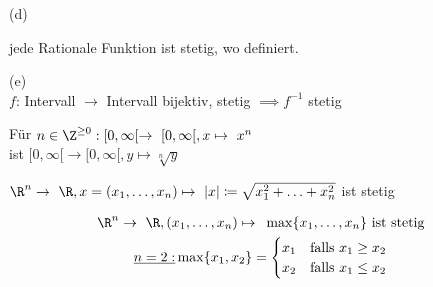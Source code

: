 (d)\\
\begin{folge}
	jede Rationale Funktion ist stetig, wo definiert.
\end{folge}

(e)\\
$f$: Intervall $\rightarrow$ Intervall bijektiv, stetig $\implies f^{-1}$ stetig\\
\begin{bsp*}
	Für $n \in \Z^{\geq 0} : [0,\infty[ \rightarrow [0,\infty[, x \mapsto x^n$\\
	ist $[0,\infty[ \rightarrow [0,\infty[, y \mapsto \sqrt[n]{y}$
\end{bsp*}
\begin{bsp*}
	$\R^n \rightarrow \R , x = ( x_1 , \dotsc , x_n ) \mapsto \abs{x} \coloneqq \sqrt{x_1^2 + \dotsc + x_n^2}$ ist stetig
\end{bsp*}
\begin{bsp*}
	\begin{gather*}
		\R^n \rightarrow \R , (x_1 , \dotsc , x_n) \mapsto \max\{x_1 , \dotsc , x_n\} \text{ ist stetig}\\
		\underline{n=2:} \max\{ x_1 , x_2 \} = \begin{cases}
			x_1	&\text{falls } x_1 \geq x_2	\\
			x_2	&\text{falls } x_1 \leq x_2	
		\end{cases}
	\end{gather*}
\end{bsp*}

